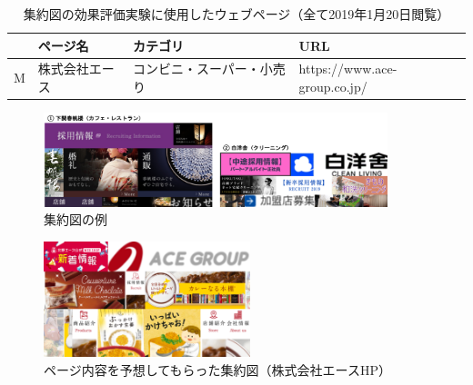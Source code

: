 \begin{table}[h]
    \caption{集約図の効果評価実験に使用したウェブページ（全て2019年1月20日閲覧）}
    \label{table:webpage-list3}
    \centering
    \begingroup
    \renewcommand{\arraystretch}{1.2} %
    \small
     \begin{tabular}{llll}
      \hline
      & ページ名 & カテゴリ & URL \\
      \hline \hline
      M & 株式会社エース & コンビニ・スーパー・小売り & https://www.ace-group.co.jp/ \\
      \hline
    \end{tabular}
    \endgroup
\end{table}


\begin{figure}[H]
    \centering
    \includegraphics[width=10cm]{figures/experience03-2.png}
    \caption{集約図の例}
    \label{fig_experience03-2}
\end{figure}

\begin{figure}[H]
    \centering
    \includegraphics[width=6cm]{figures/experience03-1.png}
    \caption{ページ内容を予想してもらった集約図（株式会社エースHP）}
    \label{fig_experience03-1}
\end{figure}


